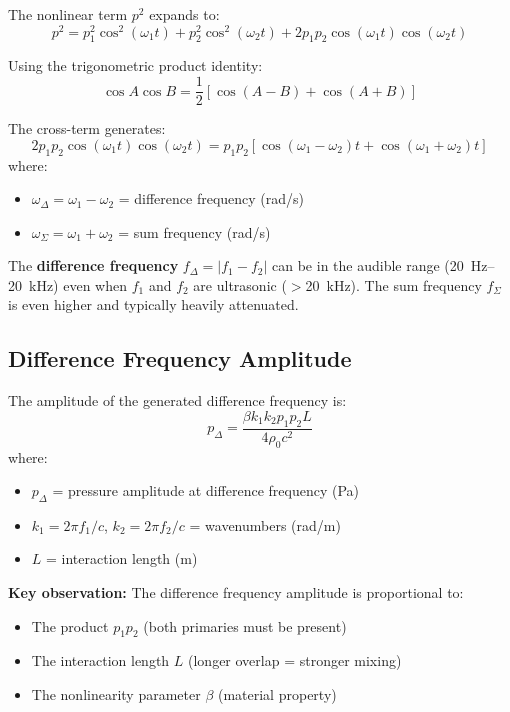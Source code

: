 The nonlinear term $p^2$ expands to:
\begin{equation}
p^2 = p_1^2\cos^2(\omega_1 t) + p_2^2\cos^2(\omega_2 t) + 2p_1 p_2 \cos(\omega_1 t)\cos(\omega_2 t)
\end{equation}

Using the trigonometric product identity:
\begin{equation}
\cos A \cos B = \frac{1}{2}[\cos(A-B) + \cos(A+B)]
\end{equation}

The cross-term generates:
\begin{equation}
2p_1 p_2 \cos(\omega_1 t)\cos(\omega_2 t) = p_1 p_2[\cos(\omega_1 - \omega_2)t + \cos(\omega_1 + \omega_2)t]
\end{equation}
where:
\begin{itemize}
\item $\omega_\Delta = \omega_1 - \omega_2$ = difference frequency (rad/s)
\item $\omega_\Sigma = \omega_1 + \omega_2$ = sum frequency (rad/s)
\end{itemize}

\begin{keyconcept}
The \textbf{difference frequency} $f_\Delta = |f_1 - f_2|$ can be in the audible range (20~Hz--20~kHz) even when $f_1$ and $f_2$ are ultrasonic ($>$20~kHz). The sum frequency $f_\Sigma$ is even higher and typically heavily attenuated.
\end{keyconcept}

\subsection{Difference Frequency Amplitude}

The amplitude of the generated difference frequency is:
\begin{equation}
p_\Delta = \frac{\beta k_1 k_2 p_1 p_2 L}{4 \rho_0 c^2}
\end{equation}
where:
\begin{itemize}
\item $p_\Delta$ = pressure amplitude at difference frequency (Pa)
\item $k_1 = 2\pi f_1/c$, $k_2 = 2\pi f_2/c$ = wavenumbers (rad/m)
\item $L$ = interaction length (m)
\end{itemize}

\textbf{Key observation:} The difference frequency amplitude is proportional to:
\begin{itemize}
\item The product $p_1 p_2$ (both primaries must be present)
\item The interaction length $L$ (longer overlap = stronger mixing)
\item The nonlinearity parameter $\beta$ (material property)
\end{itemize}

